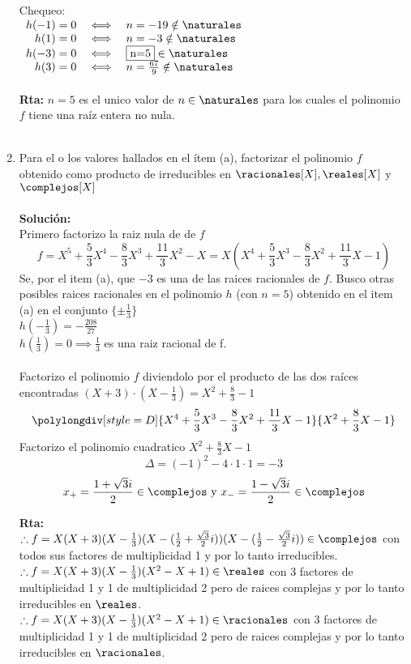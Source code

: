 \begin{enumerate}[label=\alph*)]
Chequeo:\\
$
\begin{array}{rcl}
h(-1)=0 & \iff & n=-19 \notin \naturales \\
h(1)=0  & \iff & n=-3 \notin \naturales \\
h(-3)=0 & \iff & \fbox{n=5} \in \naturales \\
h(3)=0  & \iff & n=\frac{67}{9} \notin \naturales \\
\end{array}
$ \\
\\
\textbf{Rta:} $n=5$ es el unico valor de $n\in\naturales$ para los cuales el polinomio $f$ tiene una raíz entera no nula.\\
\\
\item 
Para el o los valores hallados en el ítem (a), factorizar el polinomio $f$ obtenido como producto de irreducibles en $\racionales[X],\reales[X]$ y $\complejos[X]$ \\
\\
\textbf{Solución:}\\
Primero factorizo la raiz nula de de $f$ \\
$$
f=X^5 + \frac{5}{3}X^4 - \frac{8}{3}X^3 + \frac{11}{3}X^2 - X = 
X(X^4 + \frac{5}{3}X^3 - \frac{8}{3}X^2 + \frac{11}{3}X - 1)
$$
Se, por el item (a), que $-3$ es una de las raices racionales de $f$. Busco otras posibles raices racionales en el polinomio $h$ (con $n=5$) obtenido en el item (a) en el conjunto $\{ \pm\frac{1}{3} \}$ \\
$h(-\frac{1}{3})=-\frac{208}{27}$ \\
$h(\frac{1}{3})=0 \implies \frac{1}{3}$ es una raiz racional de f. \\
\\
Factorizo el polinomio $f$ diviendolo por el producto de las dos raíces encontradas $(X+3)\cdot(X-\frac{1}{3}) = X^2 + \frac{8}{3} - 1$
$$
\polylongdiv[style=D]{X^4 + \frac{5}{3}X^3 - \frac{8}{3}X^2 + \frac{11}{3}X - 1}{X^2 + \frac{8}{3}X - 1}
$$
Factorizo el polinomio cuadratico $X^2 + \frac{8}{3}X - 1$
$$ \Delta = (-1)^2 - 4 \cdot 1 \cdot 1=-3 $$
$$ x_+ = \frac{1 + \sqrt 3 i}{2} \in\complejos \text{ y } x_- = \frac{1 - \sqrt 3 i}{2} \in\complejos $$

\textbf{Rta:}\\
$\therefore f = X(X+3)( X - \frac{1}{3} )( X - (\frac{1}{2} + \frac{\sqrt 3}{2}i) )( X - (\frac{1}{2} - \frac{\sqrt 3}{2}i) ) \in \complejos$ con todos sus factores de multiplicidad 1 y por lo tanto irreducibles. \\
$\therefore f = X(X+3)( X - \frac{1}{3} )(X^2-X+1) \in \reales$ con 3 factores de multiplicidad 1 y 1 de multiplicidad 2 pero de raices complejas y por lo tanto irreducibles en $\reales$. \\
$\therefore f = X(X+3)( X - \frac{1}{3} )(X^2-X+1) \in \racionales$ con 3 factores de multiplicidad 1 y 1 de multiplicidad 2 pero de raices complejas y por lo tanto irreducibles en $\racionales$. \\
\end{enumerate}











